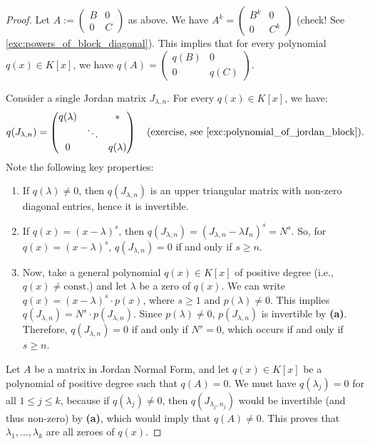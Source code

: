 \begin{proof}
Let $A := \left(\begin{smallmatrix} B & 0 \\ 0 & C \end{smallmatrix}\right)$ as above. We have $A^k = \left(\begin{smallmatrix} B^k & 0 \\ 0 & C^k \end{smallmatrix}\right)$ (check! See \cref{exc:powers_of_block_diagonal}). This implies that for every polynomial $q(x) \in K[x]$, we have $q(A) = \left(\begin{smallmatrix} q(B) & 0 \\ 0 & q(C) \end{smallmatrix}\right)$.

Consider a single Jordan matrix $J_{\lambda, n}$. For every $q(x) \in K[x]$, we have:
\[
q(J_{\lambda, n}) = \begin{pmatrix} q(\lambda) & & * \\ & \ddots & \\ 0 & & q(\lambda) \end{pmatrix} \quad \text{(exercise, see \cref{exc:polynomial_of_jordan_block})}.
\]
Note the following key properties:
\begin{enumerate}[label=\textbf{(\alph*)}]
    \item If $q(\lambda) \neq 0$, then $q(J_{\lambda, n})$ is an upper triangular matrix with non-zero diagonal entries, hence it is invertible.
    \item If $q(x) = (x-\lambda)^s$, then $q(J_{\lambda, n}) = (J_{\lambda, n} - \lambda I_n)^s = N^s$. So, for $q(x) = (x-\lambda)^s$, $q(J_{\lambda, n}) = 0$ if and only if $s \ge n$.
    \item Now, take a general polynomial $q(x) \in K[x]$ of positive degree (i.e., $q(x) \neq \text{const.}$) and let $\lambda$ be a zero of $q(x)$. We can write $q(x) = (x-\lambda)^s \cdot p(x)$, where $s \ge 1$ and $p(\lambda) \neq 0$. This implies $q(J_{\lambda, n}) = N^s \cdot p(J_{\lambda, n})$. Since $p(\lambda) \neq 0$, $p(J_{\lambda, n})$ is invertible by \textbf{(a)}. Therefore, $q(J_{\lambda, n}) = 0$ if and only if $N^s = 0$, which occurs if and only if $s \ge n$.
\end{enumerate}

Let $A$ be a matrix in Jordan Normal Form, and let $q(x) \in K[x]$ be a polynomial of positive degree such that $q(A) = 0$. We must have $q(\lambda_j) = 0$ for all $1 \le j \le k$, because if $q(\lambda_j) \neq 0$, then $q(J_{\lambda_j, n_j})$ would be invertible (and thus non-zero) by \textbf{(a)}, which would imply that $q(A) \neq 0$. This proves that $\lambda_1, \dots, \lambda_k$ are all zeroes of $q(x)$.


\end{proof}
